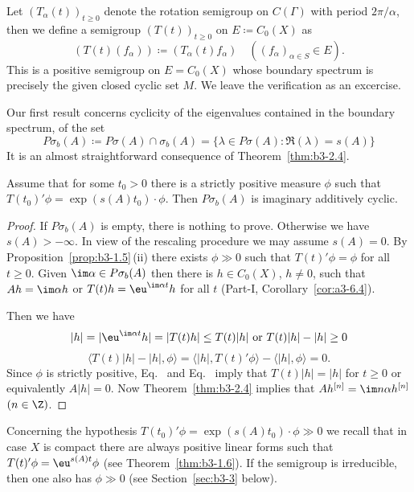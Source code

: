 \begin{examples}
\begin{enumerate}[\upshape (i), wide, labelindent=.25em]
Let $(T_{\alpha}(t))_{t \geq 0}$ denote the rotation semigroup on $C(\Gamma)$ with period $2\pi/\alpha$, then we define a semigroup $(T(t))_{t \geq 0}$ on $E \coloneqq C_{0}(X)$ as
	\[
	(T(t)(f_{\alpha})) \coloneqq (T_{\alpha}(t)f_{\alpha}) \quad ((f_{\alpha})_{\alpha \in S} \in E).
	\]
	This is a positive semigroup on $E = C_{0}(X)$ whose boundary spectrum is precisely the given closed cyclic set $M$.
	We leave the verification as an excercise.
	
\end{enumerate}
\end{examples}
Our first result concerns cyclicity of the eigenvalues contained in the boundary spectrum, \ie of the set
	\[
	P\sigma_{b}(A) \coloneqq P\sigma(A) \cap \sigma_{b}(A) = \{\lambda \in P\sigma(A) \colon \Re(\lambda)  = s(A)\}
	\]
	It is an almost straightforward consequence of Theorem~\ref{thm:b3-2.4}.
	\begin{proposition}\label{prop:b3-2.7}
		
		Assume that for some $t_{0} > 0$ there is a strictly positive measure $\phi$ such that $T(t_{0})'\phi = \exp(s(A)t_{0})\cdot\phi$.
		Then $P\sigma_{b}(A)$ is imaginary additively cyclic.
	\end{proposition}
\begin{proof}
If\/ $P\sigma_{b}(A)$ is empty, there is nothing to prove.
Otherwise we have $s(A) > -\infty$.
In view of the rescaling procedure we may assume $s(A) = 0$.
By Proposition~\ref{prop:b3-1.5}\,(ii) there exists $\phi \gg 0$ such that $T(t)'\phi = \phi$ for all $t \geq 0$.
Given $\im \alpha \in P\sigma_{b}(A)$ then there is $h \in C_{0}(X)$, $h \neq 0$, such that $Ah = \im\alpha h$ or $T(t)h = \eu^{\im\alpha t}h$ for all $t$ (Part-I, Corollary~\ref{cor:a3-6.4}).

	Then we have
	\begin{equation}\label{eq:b3-2.14}
		|h| = |\eu^{\im\alpha t}h| = |T(t)h| \leq T(t)|h| \text{ or } T(t)|h| - |h| \geq 0
	\end{equation}
	\begin{equation}\label{eq:b3-2.15}
		\langle T(t)|h| - |h|,\phi \rangle = \langle |h|,T(t)'\phi \rangle - \langle |h|,\phi \rangle = 0.
	\end{equation}
	Since $\phi$ is strictly positive, Eq.~  and Eq.~ imply that $T(t)|h| = |h|$ for $t \geq 0$ or equivalently $A|h| = 0$.
	Now Theorem~\ref{thm:b3-2.4} implies that $Ah^{[n]} = \im n\alpha h^{[n]}$ $(n \in \Z)$.
\end{proof}
Concerning the hypothesis $T(t_{0})'\phi = \exp(s(A)t_{0})\cdot\phi \gg 0$ we recall that in case $X$ is compact there are always positive linear forms such that $T(t)'\phi = \eu^{s(A)t}\phi$ (see Theorem~\ref{thm:b3-1.6}).
If the semigroup is irreducible, then one also has $\phi \gg 0$ (see Section~\ref{sec:b3-3} below).

